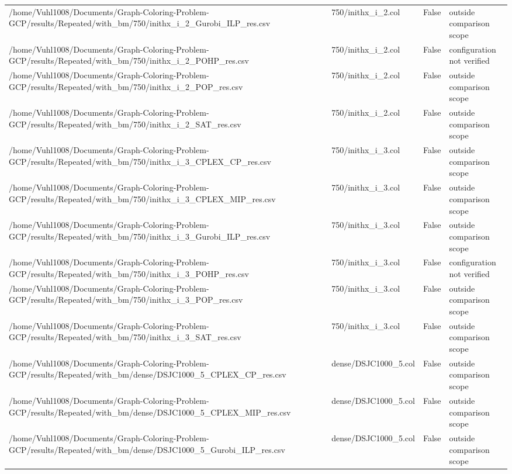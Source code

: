\begin{table}[htbp]
\begin{tabular}{llll}
/home/Vuhl1008/Documents/Graph-Coloring-Problem-GCP/results/Repeated/with\_bm/750/inithx\_i\_2\_Gurobi\_ILP\_res.csv & 750/inithx\_i\_2.col & False & outside comparison scope \\
/home/Vuhl1008/Documents/Graph-Coloring-Problem-GCP/results/Repeated/with\_bm/750/inithx\_i\_2\_POHP\_res.csv & 750/inithx\_i\_2.col & False & configuration not verified \\
/home/Vuhl1008/Documents/Graph-Coloring-Problem-GCP/results/Repeated/with\_bm/750/inithx\_i\_2\_POP\_res.csv & 750/inithx\_i\_2.col & False & outside comparison scope \\
/home/Vuhl1008/Documents/Graph-Coloring-Problem-GCP/results/Repeated/with\_bm/750/inithx\_i\_2\_SAT\_res.csv & 750/inithx\_i\_2.col & False & outside comparison scope \\
/home/Vuhl1008/Documents/Graph-Coloring-Problem-GCP/results/Repeated/with\_bm/750/inithx\_i\_3\_CPLEX\_CP\_res.csv & 750/inithx\_i\_3.col & False & outside comparison scope \\
/home/Vuhl1008/Documents/Graph-Coloring-Problem-GCP/results/Repeated/with\_bm/750/inithx\_i\_3\_CPLEX\_MIP\_res.csv & 750/inithx\_i\_3.col & False & outside comparison scope \\
/home/Vuhl1008/Documents/Graph-Coloring-Problem-GCP/results/Repeated/with\_bm/750/inithx\_i\_3\_Gurobi\_ILP\_res.csv & 750/inithx\_i\_3.col & False & outside comparison scope \\
/home/Vuhl1008/Documents/Graph-Coloring-Problem-GCP/results/Repeated/with\_bm/750/inithx\_i\_3\_POHP\_res.csv & 750/inithx\_i\_3.col & False & configuration not verified \\
/home/Vuhl1008/Documents/Graph-Coloring-Problem-GCP/results/Repeated/with\_bm/750/inithx\_i\_3\_POP\_res.csv & 750/inithx\_i\_3.col & False & outside comparison scope \\
/home/Vuhl1008/Documents/Graph-Coloring-Problem-GCP/results/Repeated/with\_bm/750/inithx\_i\_3\_SAT\_res.csv & 750/inithx\_i\_3.col & False & outside comparison scope \\
/home/Vuhl1008/Documents/Graph-Coloring-Problem-GCP/results/Repeated/with\_bm/dense/DSJC1000\_5\_CPLEX\_CP\_res.csv & dense/DSJC1000\_5.col & False & outside comparison scope \\
/home/Vuhl1008/Documents/Graph-Coloring-Problem-GCP/results/Repeated/with\_bm/dense/DSJC1000\_5\_CPLEX\_MIP\_res.csv & dense/DSJC1000\_5.col & False & outside comparison scope \\
/home/Vuhl1008/Documents/Graph-Coloring-Problem-GCP/results/Repeated/with\_bm/dense/DSJC1000\_5\_Gurobi\_ILP\_res.csv & dense/DSJC1000\_5.col & False & outside comparison scope \\

\end{tabular}
\end{table}

